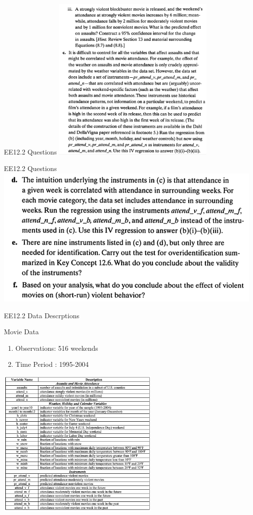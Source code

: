 \begin{frame}[fragile]{EE12.2 Questions}
\includegraphics[width=0.6\textwidth]{Images/EE12-2_3.png}
\end{frame}
\begin{frame}[fragile]{EE12.2 Questions}
\includegraphics[width=1\textwidth]{Images/EE12-2_4.png}
\end{frame}


\begin{frame}[fragile]{EE12.2 Data Descrptions}

Movie Data

\begin{enumerate}
    \item Observations: 516 weekends
    \item Time Period : 1995-2004
\end{enumerate}
\includegraphics[width=0.6\textwidth]{Images/L4-1_1.png}

\end{frame}



